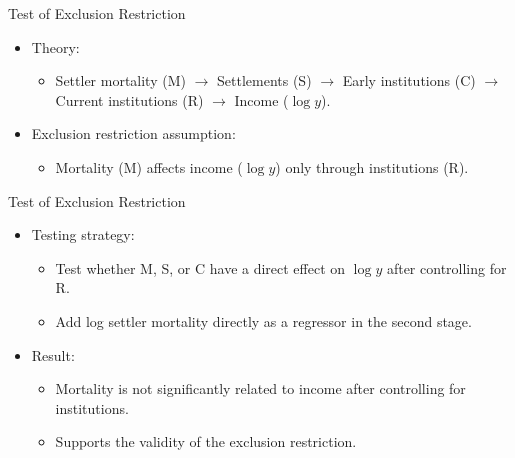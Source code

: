 \documentclass[dvipsnames,hyperref={pdfpagelabels=false}]{beamer}
\begin{document}
\begin{frame}{Test of Exclusion Restriction}
	\begin{itemize}
		\item Theory:
				\vspace{0.3cm}
		\begin{itemize}
			\item Settler mortality (M) $\rightarrow$ Settlements (S) $\rightarrow$ Early institutions (C) $\rightarrow$ Current institutions (R) $\rightarrow$ Income ($\log y$).
		\end{itemize}
		\vspace{0.3cm}
		
		\item Exclusion restriction assumption:
				\vspace{0.3cm}
		\begin{itemize}
			\item Mortality (M) affects income ($\log y$) only through institutions (R).
		\end{itemize}
		\vspace{0.3cm}
		
	
	\end{itemize}
\end{frame}



\begin{frame}{Test of Exclusion Restriction}
	\begin{itemize}
	
		
		\item Testing strategy:
				\vspace{0.3cm}
		\begin{itemize}
			\item Test whether M, S, or C have a direct effect on $\log y$ after controlling for R.
					\vspace{0.3cm}
			\item Add log settler mortality directly as a regressor in the second stage.
		\end{itemize}
		\vspace{0.3cm}
		
		\item Result:
				\vspace{0.3cm}
		\begin{itemize}
			\item Mortality is not significantly related to income after controlling for institutions.
					\vspace{0.3cm}
			\item Supports the validity of the exclusion restriction.
		\end{itemize}
	\end{itemize}
\end{frame}
\end{document}
